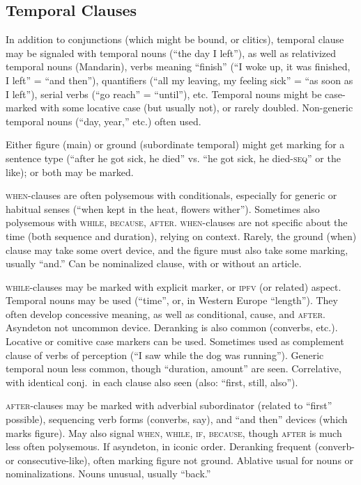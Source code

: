 \documentclass[11pt]{article}
\newcommand{\I}[1]{\textsc{#1}}   %
\begin{document}
{%

\subsection{Temporal Clauses}
In addition to conjunctions (which might be bound, or clitics),
temporal clause may be signaled with temporal nouns (``the day I
left''), as well as relativized temporal nouns (Mandarin), verbs
meaning ``finish'' (``I woke up, it was finished, I left'' = ``and
then''), quantifiers (``all my leaving, my feeling sick'' = ``as soon
as I left''), serial verbs (``go reach'' = ``until''), etc.  Temporal
nouns might be case-marked with some locative case (but usually not),
or rarely doubled.  Non-generic temporal nouns (``day, year,'' etc.)
often used.

Either figure (main) or ground (subordinate temporal) might get
marking for a sentence type (``after he got sick, he died'' vs. ``he
got sick, he died-\I{seq}'' or the like); or both may be marked.

\I{when}-clauses are often polysemous with conditionals, especially
for generic or habitual senses (``when kept in the heat, flowers
wither'').  Sometimes also polysemous with \I{while, because, after}.
\I{when}-clauses are not specific about the time (both sequence and
duration), relying on context.  Rarely, the ground (when) clause may
take some overt device, and the figure must also take some marking,
usually ``and.''  Can be nominalized clause, with or without an
article. 

\I{while}-clauses may be marked with explicit marker, or \I{ipfv} (or
related) aspect.  Temporal nouns may be used (``time'', or, in Western
Europe ``length'').  They often develop concessive meaning, as well as
conditional, cause, and \I{after}.  Asyndeton not uncommon device.
Deranking is also common (converbs, etc.).  Locative or comitive case
markers can be used.  Sometimes used as complement clause of verbs of
perception (``I saw while the dog was running'').  Generic temporal
noun less common, though ``duration, amount'' are seen.  Correlative,
with identical conj.\ in each clause also seen (also: ``first, still,
also'').  

\I{after}-clauses may be marked with adverbial subordinator (related
to ``first'' possible), sequencing verb forms (converbs, say), and
``and then'' devices (which marks figure).  May also signal \I{when,
while, if, because,} though \I{after} is much less often polysemous.
If asyndeton, in iconic order.  Deranking frequent (converb- or
consecutive-like), often marking figure not ground.  Ablative usual
for nouns or nominalizations.  Nouns unusual, usually ``back.''

}
\end{document}
